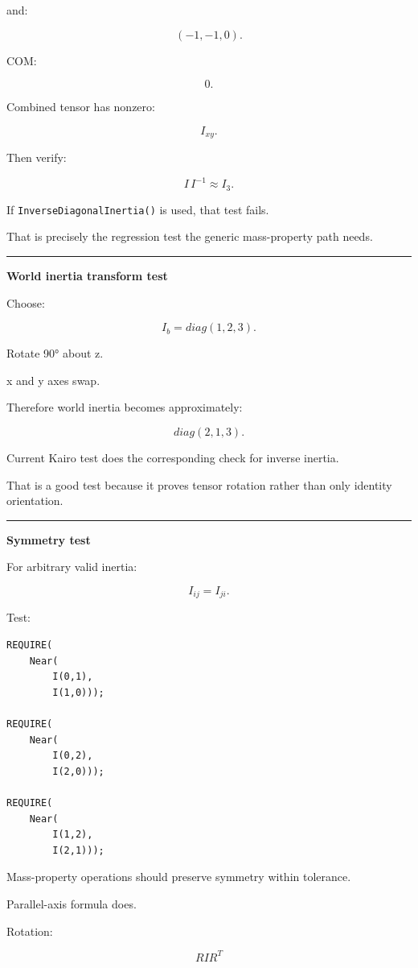 and:

\[
(-1,-1,0).
\]

COM:

\[
0.
\]

Combined tensor has nonzero:

\[
I_{xy}.
\]

Then verify:

\[
I\,I^{-1}
\approx
I_3.
\]

If \texttt{InverseDiagonalInertia()} is used, that test fails.

That is precisely the regression test the generic mass-property path needs.

\begin{center}\rule{0.5\linewidth}{0.5pt}\end{center}

\textbf{World inertia transform test}

Choose:

\[
I_b=
diag(1,2,3).
\]

Rotate 90° about z.

x and y axes swap.

Therefore world inertia becomes approximately:

\[
diag(2,1,3).
\]

Current Kairo test does the corresponding check for inverse inertia.

That is a good test because it proves tensor rotation rather than only identity orientation.

\begin{center}\rule{0.5\linewidth}{0.5pt}\end{center}

\textbf{Symmetry test}

For arbitrary valid inertia:

\[
I_{ij}=I_{ji}.
\]

Test:

\begin{verbatim}
REQUIRE(
    Near(
        I(0,1),
        I(1,0)));

REQUIRE(
    Near(
        I(0,2),
        I(2,0)));

REQUIRE(
    Near(
        I(1,2),
        I(2,1)));
\end{verbatim}

Mass-property operations should preserve symmetry within tolerance.

Parallel-axis formula does.

Rotation:

\[
RIR^T
\]

